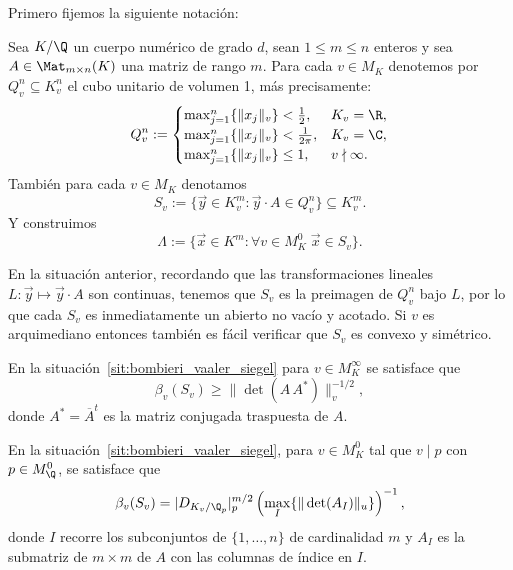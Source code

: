 \documentclass[teoria-numeros.tex]{subfiles}
\begin{document}
Primero fijemos la siguiente notación:
\begin{sit}\label{sit:bombieri_vaaler_siegel}
	Sea $K/\Q$ un cuerpo numérico de grado $d$, sean $1 \le m \le n$ enteros y sea $A \in \Mat_{m\times n}(K)$ una matriz de rango $m$.
	Para cada $v \in M_K$ denotemos por $Q_v^n \subseteq K_v^n$ el cubo unitario de volumen 1, más precisamente:
	\[
		Q_v^n :=
		\begin{cases}
			\max_{j=1}^n\{ \|x_j\|_v \} < \frac{1}{2}, & K_v = \R, \\
			\max_{j=1}^n\{ \|x_j\|_v \} < \frac{1}{2\pi}, & K_v = \C, \\
			\max_{j=1}^n\{ \|x_j\|_v \} \le 1, & v \nmid \infty.
		\end{cases}
	\]
	También para cada $v \in M_K$ denotamos
	$$ S_v := \{ \vec y \in K_v^m : \vec y\cdot A \in Q_v^n \} \subseteq K_v^m. $$
	Y construimos
	$$ \Lambda := \{ \vec x \in K^m : \forall v \in M_K^0 \; \vec x \in S_v \}. $$
\end{sit}
\begin{obs}
	En la situación anterior,
	recordando que las transformaciones lineales $L\colon \vec y \mapsto \vec y\cdot A$ son continuas, tenemos que $S_v$ es la preimagen de $Q_v^n$
	bajo $L$, por lo que cada $S_v$ es inmediatamente un abierto no vacío y acotado.
	Si $v$ es arquimediano entonces también es fácil verificar que $S_v$ es convexo y simétrico.
\end{obs}

\begin{lem}
	En la situación~\ref{sit:bombieri_vaaler_siegel} para $v \in M_K^\infty$ se satisface que
	$$ \beta_v(S_v) \ge \|\det(A\,A^*)\|_v^{-1/2}, $$
	donde $A^* = \overline{A}^t$ es la matriz conjugada traspuesta de $A$.
\end{lem}

\begin{lem}
	En la situación~\ref{sit:bombieri_vaaler_siegel}, para $v \in M_K^0$ tal que $v \mid p$ con $p \in M_\Q^0$, se satisface que
	$$ \beta_v(S_v) = |D_{K_v/\Q_p}|_p^{m/2} \left( \max_I\{ \|\det(A_I)\|_u \} \right)^{-1}, $$
	donde $I$ recorre los subconjuntos de $\{ 1, \dots, n \}$ de cardinalidad $m$ y $A_I$ es la submatriz de $m\times m$ de $A$
	con las columnas de índice en $I$.
\end{lem}
\end{document}

